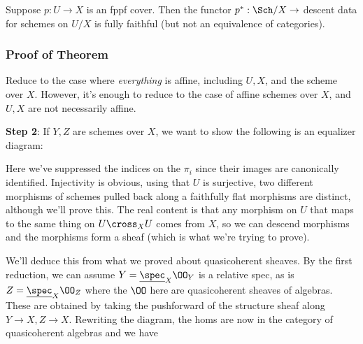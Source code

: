 \begin{theorem}[?]

Suppose \(p:U\to X\) is an fppf cover. Then the functor
\(p^*: \Sch/X \to\) descent data for schemes on \(U/X\) is fully
faithful (but not an equivalence of categories).

\end{theorem}

\hypertarget{proof-of-theorem-1}{%
\subsubsection{Proof of Theorem}\label{proof-of-theorem-1}}

\begin{exercise}[Step 1]

Reduce to the case where \emph{everything} is affine, including
\(U, X\), and the scheme over \(X\). However, it's enough to reduce to
the case of affine schemes over \(X\), and \(U, X\) are not necessarily
affine.

\end{exercise}

\textbf{Step 2}: If \(Y,Z\) are schemes over \(X\), we want to show the
following is an equalizer diagram:

\begin{center}
\end{center}

Here we've suppressed the indices on the \(\pi_i\) since their images
are canonically identified. Injectivity is obvious, using that \(U\) is
surjective, two different morphisms of schemes pulled back along a
faithfully flat morphisms are distinct, although we'll prove this. The
real content is that any morphism on \(U\) that maps to the same thing
on \(U\cross_X U\) comes from \(X\), so we can descend morphisms and the
morphisms form a sheaf (which is what we're trying to prove).

We'll deduce this from what we proved about quasicoherent sheaves. By
the first reduction, we can assume \(Y = \underline{\spec}_X \OO_Y\) is
a relative spec, as is \(Z = \underline{\spec}_X \OO_Z\) where the
\(\OO\) here are quasicoherent sheaves of algebras. These are obtained
by taking the pushforward of the structure sheaf along
\(Y\to X, Z\to X\). Rewriting the diagram, the homs are now in the
category of quasicoherent algebras and we have

